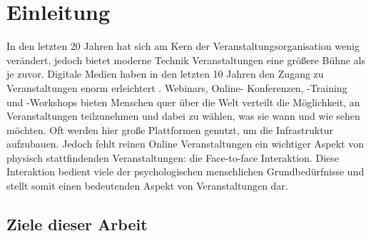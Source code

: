 \chapter{Einleitung}

%
%

In den letzten 20 Jahren hat sich am Kern der Veranstaltungsorganisation wenig
verändert, jedoch bietet moderne Technik Veranstaltungen eine größere Bühne als
je zuvor. Digitale Medien haben in den letzten 10 Jahren den Zugang zu
Veranstaltungen enorm erleichtert \cite{Bladen2017}. Webinars, Online-
Konferenzen, -Training und -Workshops bieten Menschen quer über die Welt verteilt
die Möglichkeit, an Veranstaltungen teilzunehmen und dabei zu wählen, was sie
wann und wie sehen möchten. Oft werden hier große Plattformen genutzt, um die
Infrastruktur aufzubauen. Jedoch fehlt reinen Online Veranstaltungen ein
wichtiger Aspekt von physisch stattfindenden Veranstaltungen: die Face-to-face
Interaktion. Diese Interaktion bedient viele der psychologischen menschlichen
Grundbedürfnisse \cite{Maslow1943} und stellt somit einen bedeutenden Aspekt
von Veranstaltungen dar.

%



\section{Ziele dieser Arbeit} \label{sec:goals}

